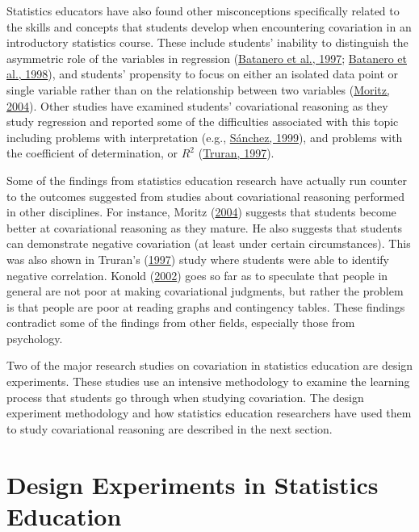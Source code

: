 \documentclass[11pt]{umnthesis}
\begin{document}
Statistics educators have also found other misconceptions specifically related to the skills and concepts that students develop when encountering covariation in an introductory statistics course. These include students' inability to distinguish the asymmetric role of the variables in regression (\protect\hyperlink{ref-batanero:1997}{Batanero et al., 1997}; \protect\hyperlink{ref-batanero:1998}{Batanero et al., 1998}), and students' propensity to focus on either an isolated data point or single variable rather than on the relationship between two variables (\protect\hyperlink{ref-moritz:2004}{Moritz, 2004}). Other studies have examined students' covariational reasoning as they study regression and reported some of the difficulties associated with this topic including problems with interpretation (e.g., \protect\hyperlink{ref-sanchez:1999}{Sánchez, 1999}), and problems with the coefficient of determination, or \(R^2\) (\protect\hyperlink{ref-truran:1997}{Truran, 1997}).

Some of the findings from statistics education research have actually run counter to the outcomes suggested from studies about covariational reasoning performed in other disciplines. For instance, Moritz (\protect\hyperlink{ref-moritz:2004}{2004}) suggests that students become better at covariational reasoning as they mature. He also suggests that students can demonstrate negative covariation (at least under certain circumstances). This was also shown in Truran's (\protect\hyperlink{ref-truran:1997}{1997}) study where students were able to identify negative correlation. Konold (\protect\hyperlink{ref-konold:2002}{2002}) goes so far as to speculate that people in general are not poor at making covariational judgments, but rather the problem is that people are poor at reading graphs and contingency tables. These findings contradict some of the findings from other fields, especially those from psychology.

Two of the major research studies on covariation in statistics education are design experiments. These studies use an intensive methodology to examine the learning process that students go through when studying covariation. The design experiment methodology and how statistics education researchers have used them to study covariational reasoning are described in the next section.

\hypertarget{design-exp}{%
\section{Design Experiments in Statistics Education}\label{design-exp}}
\end{document}
